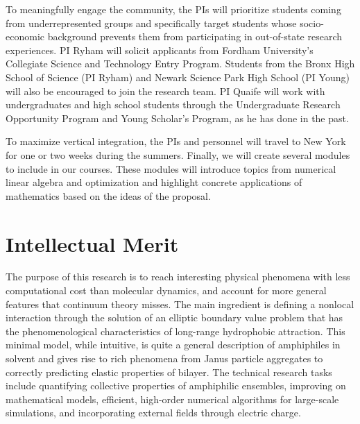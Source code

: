 To meaningfully engage the community, the PIs will prioritize students
coming from underrepresented groups and specifically target students
whose socio-economic background prevents them from participating in
out-of-state research experiences.  PI Ryham will solicit applicants
from Fordham University's Collegiate Science and Technology Entry
Program.  Students from the Bronx High School of Science (PI Ryham) and
Newark Science Park High School (PI Young) will also be encouraged to
join the research team. PI Quaife will work with undergraduates and high
school students through the Undergraduate Research Opportunity Program
and Young Scholar's Program, as he has done in the past.

To maximize vertical integration, the PIs and personnel
will travel to New York for one or two weeks during the summers.
Finally, we will create several modules to include in our courses. These
modules will introduce topics from numerical linear algebra and
optimization and highlight concrete applications of mathematics
based on the ideas of the proposal.

\section{Intellectual Merit}
\label{sec:IntellectualMerit}
The purpose of this research is to reach interesting physical phenomena with less computational cost than molecular dynamics, and account for more general features that continuum theory misses. The main ingredient is defining a nonlocal interaction through the solution of an elliptic boundary value problem that has the phenomenological characteristics of long-range hydrophobic attraction. This minimal model, while intuitive, is quite a general description of amphiphiles in solvent and gives rise to rich phenomena from Janus particle aggregates to correctly predicting elastic properties of bilayer. The technical research tasks include quantifying collective properties of amphiphilic ensembles, improving on mathematical models, efficient, high-order numerical algorithms for large-scale simulations, and incorporating external fields through electric charge.

